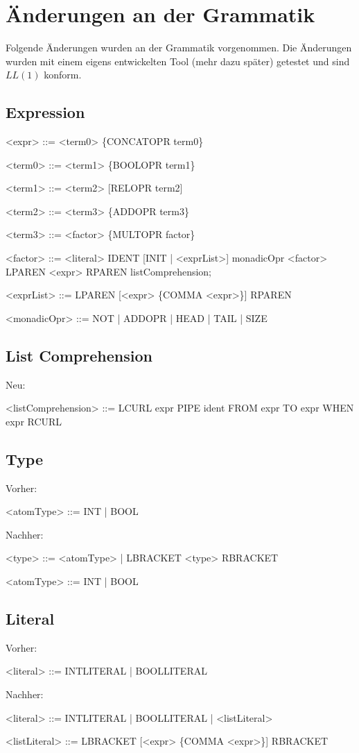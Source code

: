 \documentclass[a4paper,notitlepage,oneside]{article}
\begin{document}
\newpage
\section{Änderungen an der Grammatik}
Folgende Änderungen wurden an der Grammatik vorgenommen. Die Änderungen wurden mit einem eigens entwickelten Tool (mehr dazu später) getestet und sind $LL(1)$ konform.
\subsection{Expression}
\begin{grammar}
<expr> ::= <term0> \{CONCATOPR term0\}

<term0> ::= <term1> \{BOOLOPR term1\}

<term1> ::= <term2> [RELOPR term2]

<term2> ::= <term3> \{ADDOPR term3\}

<term3> ::= <factor> \{MULTOPR factor\}

<factor> ::= <literal>
		\alt IDENT [INIT | <exprList>]
		\alt monadicOpr <factor>
		\alt LPAREN <expr> RPAREN
		\alt listComprehension;
		
<exprList> ::= LPAREN [<expr> \{COMMA <expr>\}] RPAREN

<monadicOpr> ::= NOT | ADDOPR | HEAD | TAIL | SIZE

\end{grammar}


\subsection{List Comprehension}
Neu:
\begin{grammar}
<listComprehension> ::=  LCURL expr PIPE ident FROM expr TO expr WHEN expr RCURL
\end{grammar}

\subsection{Type}
Vorher:
\begin{grammar}
<atomType> ::= INT | BOOL
\end{grammar}
Nachher:
\begin{grammar}
<type> ::=  <atomType> | LBRACKET <type> RBRACKET

<atomType> ::= INT | BOOL
\end{grammar}

\subsection{Literal}
Vorher:
\begin{grammar}
<literal> ::= INTLITERAL | BOOLLITERAL
\end{grammar}
Nachher:
\begin{grammar}
<literal> ::= INTLITERAL | BOOLLITERAL | <listLiteral>

<listLiteral> ::= LBRACKET [<expr> \{COMMA <expr>\}] RBRACKET
\end{grammar}
\newpage
\end{document}
